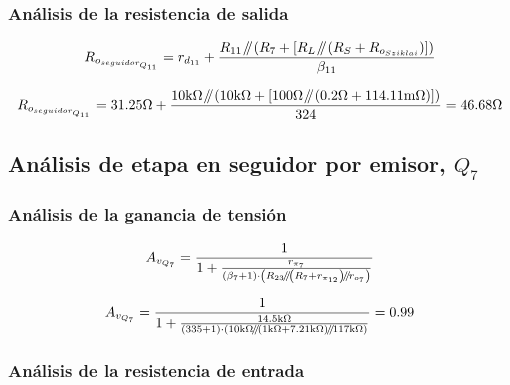 \subsubsection{Análisis de la resistencia de salida}

\begin{equation}
R_{o_{seguidor_{Q_{11}}}} = r_{d_{11}} + \frac{   R_{11} \parallelresistors \left( R_{7} + \left[  R_{L} \parallelresistors \left( R_{S} + R_{o_{Sziklai}} \right) \right]  \right) }{\beta_{11}}  
\end{equation}


\begin{equation*}
R_{o_{seguidor_{Q_{11}}}} = 31.25 \si[per-mode=symbol]{\ohm} + \frac{   10 \si[per-mode=symbol]{\kilo\ohm} \parallelresistors \left( 10 \si[per-mode=symbol]{\kilo\ohm} + \left[  100 \si[per-mode=symbol]{\ohm} \parallelresistors \left( 0.2 \si[per-mode=symbol]{\ohm} + 114.11 \si[per-mode=symbol]{\milli\ohm} \right) \right]  \right) }{324} = 46.68 \si[per-mode=symbol]{\ohm}
\end{equation*}


\subsection{Análisis de etapa en seguidor por emisor, $Q_{7}$}



\subsubsection{Análisis de la ganancia de tensión}

\begin{equation}
A_{v_{Q_{7}}} = \frac{1}{1 + \frac{r_{\pi_{7}}}{  \left(  \beta_{7} + 1 \right) \cdot \left(  R_{23} \parallelresistors \left(  R_{7} + r_{\pi_{12}} \right) \parallelresistors r_{o_{7}}  \right)  } }
\end{equation}


\begin{equation*}
A_{v_{Q_{7}}} = \frac{1}{1 + \frac{ 14.5 \si[per-mode=symbol]{\kilo\ohm} }{  \left(  335 + 1 \right) \cdot \left(  10 \si[per-mode=symbol]{\kilo\ohm} \parallelresistors \left(  1 \si[per-mode=symbol]{\kilo\ohm} + 7.21 \si[per-mode=symbol]{\kilo\ohm} \right) \parallelresistors 117 \si[per-mode=symbol]{\kilo\ohm}  \right)  } } = 0.99
\end{equation*}


\subsubsection{Análisis de la resistencia de entrada}

